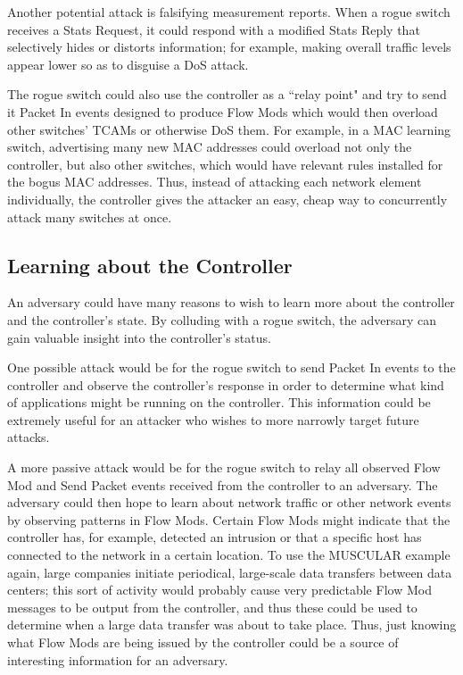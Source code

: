 Another potential attack is falsifying measurement reports. When a rogue switch receives a Stats Request, it could respond with a modified Stats Reply that selectively hides or distorts information; for example, making overall traffic levels appear lower so as to disguise a DoS attack. 

The rogue switch could also use the controller as a ``relay point" and try to send it Packet In events designed to produce Flow Mods which would then overload other switches' TCAMs or otherwise DoS them. For example, in a MAC learning switch, advertising many new MAC addresses could overload not only the controller, but also other switches, which would have relevant rules installed for the bogus MAC addresses. Thus, instead of attacking each network element individually, the controller gives the attacker an easy, cheap way to concurrently attack many switches at once. 

\subsection{Learning about the Controller}
An adversary could have many reasons to wish to learn more about the controller and the controller's state. By colluding with a rogue switch, the adversary can gain valuable insight into the controller's status.

One possible attack would be for the rogue switch to send Packet In events to the controller and observe the controller's response in order to determine what kind of applications might be running on the controller. This information could be extremely useful for an attacker who wishes to more narrowly target future attacks.

A more passive attack would be for the rogue switch to relay all observed Flow Mod and Send Packet events received from the controller to an adversary. The adversary could then hope to learn about network traffic or other network events by observing patterns in Flow Mods. Certain Flow Mods might indicate that the controller has, for example, detected an intrusion or that a specific host has connected to the network in a certain location. To use the MUSCULAR example again, large companies initiate periodical, large-scale data transfers between data centers; this sort of activity would probably cause very predictable Flow Mod messages to be output from the controller, and thus these could be used to determine when a large data transfer was about to take place. Thus, just knowing what Flow Mods are being issued by the controller could be a source of interesting information for an adversary.

